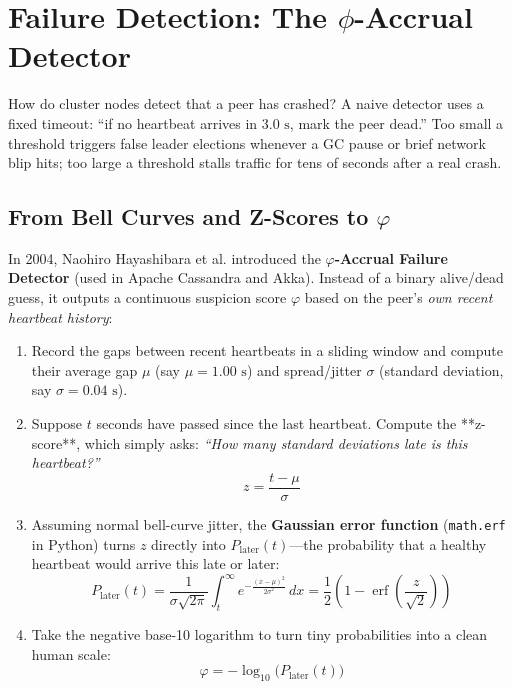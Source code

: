 \section[Failure Detection: The Phi-Accrual Detector]{Failure Detection: The $\phi$-Accrual Detector}

How do cluster nodes detect that a peer has crashed? A naive detector uses a fixed timeout: ``if no heartbeat arrives in $3.0\text{ s}$, mark the peer dead.'' Too small a threshold triggers false leader elections whenever a GC pause or brief network blip hits; too large a threshold stalls traffic for tens of seconds after a real crash.

\subsection{From Bell Curves and Z-Scores to $\varphi$}

In 2004, Naohiro Hayashibara et al. introduced the \textbf{$\varphi$-Accrual Failure Detector} (used in Apache Cassandra and Akka). Instead of a binary alive/dead guess, it outputs a continuous suspicion score $\varphi$ based on the peer's \emph{own recent heartbeat history}:
\begin{enumerate}[leftmargin=18pt]
  \item Record the gaps between recent heartbeats in a sliding window and compute their average gap $\mu$ (say $\mu = 1.00\text{ s}$) and spread/jitter $\sigma$ (standard deviation, say $\sigma = 0.04\text{ s}$).
  \item Suppose $t$ seconds have passed since the last heartbeat. Compute the **z-score**, which simply asks: \emph{``How many standard deviations late is this heartbeat?''}
  \begin{equation}
  z = \frac{t - \mu}{\sigma}
  \end{equation}
  \item Assuming normal bell-curve jitter, the \textbf{Gaussian error function} (\texttt{math.erf} in Python) turns $z$ directly into $P_{\text{later}}(t)$---the probability that a healthy heartbeat would arrive this late or later:
  \begin{equation}
  P_{\text{later}}(t) = \frac{1}{\sigma\sqrt{2\pi}} \int_t^\infty e^{-\frac{(x-\mu)^2}{2\sigma^2}}\,dx = \frac{1}{2}\left(1 - \operatorname{erf}\!\left(\frac{z}{\sqrt{2}}\right)\right)
  \end{equation}
  \item Take the negative base-10 logarithm to turn tiny probabilities into a clean human scale:
  \begin{equation}
  \varphi = -\log_{10}\!\bigl(P_{\text{later}}(t)\bigr)
  \end{equation}
\end{enumerate}


